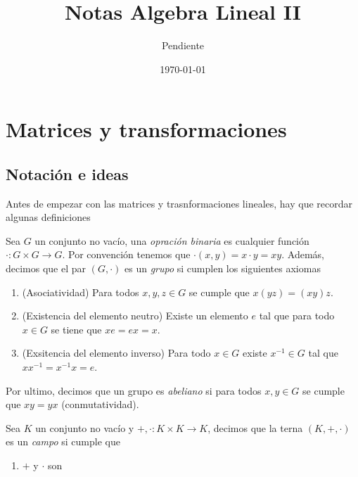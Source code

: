 \documentclass[11pt]{report}
\title{Notas Algebra Lineal II}
\author{Pendiente}
\date{\today}
\begin{document}
\maketitle

\chapter{Matrices y transformaciones}

\section{Notación e ideas}

Antes de empezar con las matrices y trasnformaciones lineales, hay que recordar algunas definiciones

\begin{defi}
  Sea $G$ un conjunto no vacío, una \emph{opración binaria} es cualquier función $\cdot \colon G \times G \to G$. Por convención tenemos que $\cdot(x,y) = x \cdot y = xy$. Además, decimos que el par $(G, \cdot)$ es un \emph{grupo} si cumplen los siguientes axiomas
  \begin{enumerate}
    \item (Asociatividad) Para todos $x, y, z \in G$ se cumple que $x(yz) = (xy)z$.
    \item (Existencia del elemento neutro) Existe un elemento $e$ tal que para todo $x \in G$ se tiene que $xe = ex = x$.
    \item (Exsitencia del elemento inverso) Para todo $x \in G$ existe $x^{-1} \in G$ tal que $xx^{-1} = x^{-1}x = e$.
  \end{enumerate}

  Por ultimo, decimos que un grupo es \emph{abeliano} si para todos $x, y \in G$ se cumple que $xy = yx$ (conmutatividad).
\end{defi}

\begin{defi}
  Sea $K$ un conjunto no vacío y $+, \cdot \colon K\times K \to K$, decimos que la terna $(K, +, \cdot)$ es un \emph{campo} si cumple que
  \begin{enumerate}
    \item $+$ y $\cdot$ son 
  \end{enumerate}
\end{defi}
\end{document}
